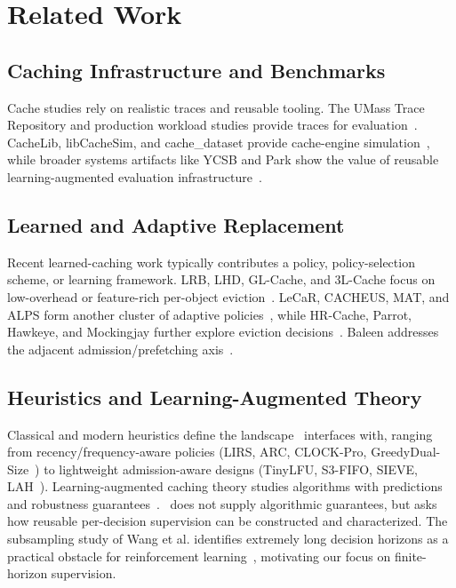 \section{Related Work}
\label{sec:related-work}

\begingroup
\sloppy

\subsection{Caching Infrastructure and Benchmarks}
Cache studies rely on realistic traces and reusable tooling. The UMass Trace Repository and production workload studies provide traces for evaluation~\cite{umasstracerepo,atikoglu2012kvworkload,yang2020twemcache}. CacheLib, libCacheSim, and cache\_dataset provide cache-engine simulation~\cite{berg2020cachelib,libcachesim,cachedataset}, while broader systems artifacts like YCSB and Park show the value of reusable learning-augmented evaluation infrastructure~\cite{cooper2010ycsb,difallah2013oltpbench,leis2018job,mao2019park}.

\subsection{Learned and Adaptive Replacement}
Recent learned-caching work typically contributes a policy, policy-selection scheme, or learning framework. LRB, LHD, GL-Cache, and 3L-Cache focus on low-overhead or feature-rich per-object eviction~\cite{song2020lrb,beckmann2018lhd,yang2023glcache,zhou2025threelcache}. LeCaR, CACHEUS, MAT, and ALPS form another cluster of adaptive policies~\cite{vietri2018lecar,rodriguez2021cacheus,yang2023mat,shahout2024alps}, while HR-Cache, Parrot, Hawkeye, and Mockingjay further explore eviction decisions~\cite{torabi2024hrcache,liu2020parrot,jain2016hawkeye,shah2022mockingjay}. Baleen addresses the adjacent admission/prefetching axis~\cite{wong2024baleen}.

\subsection{Heuristics and Learning-Augmented Theory}
Classical and modern heuristics define the landscape \lafc\ interfaces with, ranging from recency/frequency-aware policies (LIRS, ARC, CLOCK-Pro, GreedyDual-Size~\cite{jiang2002lirs,megiddo2003arc,jiang2005clockpro,cao1997greedydual}) to lightweight admission-aware designs (TinyLFU, S3-FIFO, SIEVE, LAH~\cite{einziger2017tinylfu,yang2023s3fifo,zhang2024sieve,xia2026lah}). Learning-augmented caching theory studies algorithms with predictions and robustness guarantees~\cite{lykouris2021mladvice,wei2020learningaugcache,chledowski2021robustlac,im2022parsimoniouslac,chen2026robustpaging}. \lafc\ does not supply algorithmic guarantees, but asks how reusable per-decision supervision can be constructed and characterized. The subsampling study of Wang et al. identifies extremely long decision horizons as a practical obstacle for reinforcement learning~\cite{wang2019subsampling}, motivating our focus on finite-horizon supervision.

